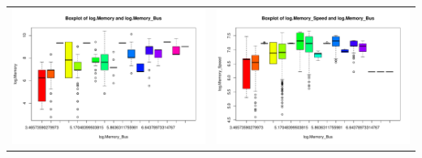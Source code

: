 \documentclass[a4paper]{article}
\begin{document}
\begin{center}
\begin{adjustbox}{width=\textwidth}
    \begin{tabular}{cc}
        \includegraphics[keepaspectratio, width=1\textwidth, height=1\textheight]{Visualization/Boxplot/mem_bus.pdf} 
        &\includegraphics[keepaspectratio, width=1\textwidth, height=1\textheight]{Visualization/Boxplot/mem_speed_bus.pdf}
    \end{tabular}
\end{adjustbox}
\end{center}
\end{document}
